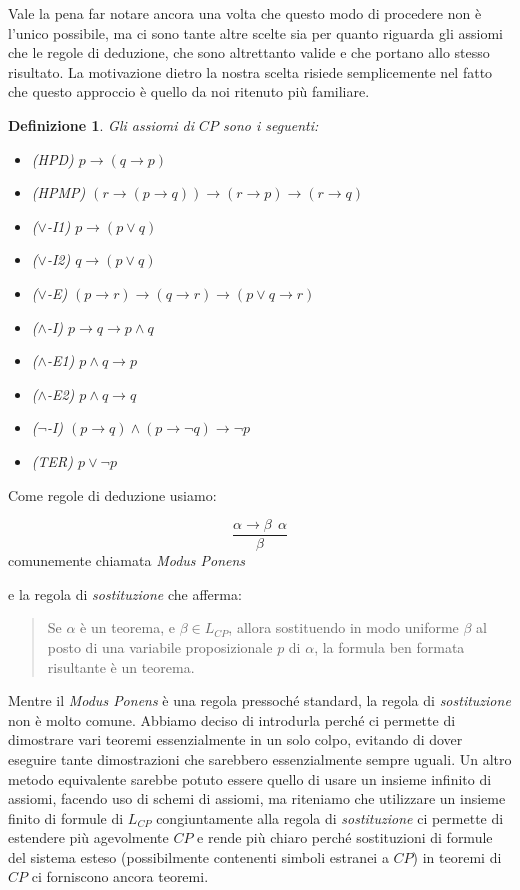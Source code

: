 \documentclass[a4paper, titlepage, 12pt]{report}
\newtheorem{definition}{Definizione}[chapter]
\begin{document}
Vale la pena far notare ancora una volta che questo modo di procedere non è l'unico
possibile, ma ci sono tante altre scelte sia
per quanto riguarda gli assiomi che le regole di deduzione, che sono altrettanto valide
e che portano allo stesso risultato. La motivazione dietro la nostra scelta
risiede semplicemente nel fatto che questo approccio è quello da noi ritenuto più familiare.

\begin{definition}
Gli assiomi di $CP$ sono i seguenti:
\begin{itemize}
\item (HPD) $p \rightarrow (q \rightarrow p)$
\item (HPMP) $(r \rightarrow (p \rightarrow q)) \rightarrow (r \rightarrow p) \rightarrow (r \rightarrow q)$
\item ($\lor$-I1) $p \rightarrow (p \lor q)$
\item ($\lor$-I2) $q \rightarrow (p \lor q)$
\item ($\lor$-E) $(p \rightarrow r) \rightarrow (q \rightarrow r) \rightarrow (p \lor q \rightarrow r)$
\item ($\land$-I) $p \rightarrow q \rightarrow p \land q$
\item ($\land$-E1) $p \land q \rightarrow p$
\item ($\land$-E2) $p \land q \rightarrow q$
\item ($\neg$-I) $(p \rightarrow q) \land (p \rightarrow \neg q) \rightarrow \neg p$
\item (TER) $p \lor \neg p$
\end{itemize}
\end{definition}

Come regole di deduzione usiamo:

$$\frac{\alpha \rightarrow \beta \ \ \alpha}{\beta}$$
comunemente chiamata \emph{Modus Ponens}

e la regola di \emph{sostituzione} che afferma:
\begin{quote}
Se $\alpha$ è un teorema, e $\beta \in L_{CP}$, allora sostituendo
in modo uniforme $\beta$ al posto di una variabile proposizionale $p$ di $\alpha$,
la formula ben formata risultante è un teorema.
\end{quote}

Mentre il \emph{Modus Ponens} è una regola pressoché standard,
la regola di \emph{sostituzione} non è molto comune. Abbiamo deciso di introdurla
perché ci permette di dimostrare vari teoremi essenzialmente in un solo colpo,
evitando di dover eseguire tante dimostrazioni che sarebbero essenzialmente sempre uguali.
Un altro metodo equivalente sarebbe potuto essere quello di usare un insieme infinito
di assiomi, facendo uso di schemi di assiomi, ma riteniamo che utilizzare un insieme
finito di formule di $L_{CP}$ congiuntamente alla regola di \emph{sostituzione}
ci permette di estendere più agevolmente $CP$ e rende più chiaro perché
sostituzioni di formule del sistema esteso (possibilmente contenenti
simboli estranei a $CP$) in teoremi di $CP$ ci forniscono ancora teoremi.
\end{document}
